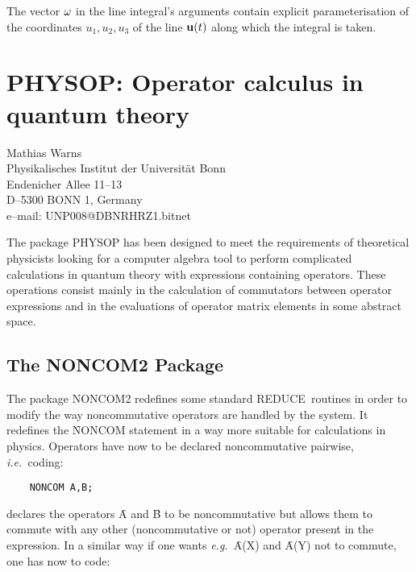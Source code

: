 \documentclass[11pt,letterpaper]{book}
\makeatletter
\newcommand{\REDUCE}{REDUCE}
\newcommand{\underscore}{\_}
\newcommand{\ttindex}[1]{{\renewcommand{\_}{\protect\underscore}%
                          \index{#1@{\tt #1}}}}
\makeatother
\begin{document}
The vector ${\bf \omega}$ in the line integral's arguments contain
explicit parameterisation of the coordinates $u_1, u_2, u_3$ of the
line ${\bf u}(t)$ along which the integral is taken.

\chapter[PHYSOP: Operator Calculus]%
{PHYSOP: Operator calculus in quantum theory}
\label{PHYSOP}

{\footnotesize
\begin{center}
Mathias Warns \\
Physikalisches Institut der Universit\"at Bonn  \\
Endenicher Allee 11--13 \\
D--5300 BONN 1, Germany \\[0.05in]
e--mail: UNP008@DBNRHRZ1.bitnet
\end{center}
}
\ttindex{PHYSOP}

The package PHYSOP has been designed to meet the requirements of
theoretical physicists looking for a
computer algebra tool to perform complicated calculations
in quantum theory
with expressions containing operators. These operations
consist mainly in the calculation of commutators between operator
expressions and in the evaluations of operator matrix elements
in some abstract space.

\section{The NONCOM2 Package}

The package NONCOM2  redefines some standard \REDUCE\ routines
in order to modify the way noncommutative operators are handled by the
system.  It redefines the \f{NONCOM}\ttindex{NONCOM} statement in
a way more suitable for calculations in physics. Operators have now to
be declared noncommutative pairwise, {\em i.e.\ }coding: \\

{\small\begin{verbatim}
    NONCOM A,B;
\end{verbatim}}
declares the operators \f{A} and \f{B} to be noncommutative but allows them
to commute with any other (noncommutative or not) operator present in
the expression. In a similar way if one wants {\em e.g.\ }\f{A(X)} and
\f{A(Y)} not to commute, one has now to code:
\end{document}
